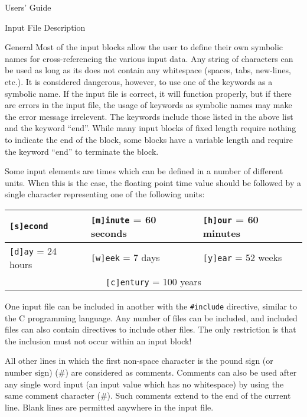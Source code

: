 \begin{chapter}{Users' Guide\label{app:user.guide}}
\begin{section}{Input File Description\label{app:user.input}}
\begin{subsection}{General}
      Most of the input blocks allow the user to define their own
      symbolic names for cross-referencing the various input data.
      Any string of characters can be used as long as its does not
      contain any whitespace (spaces, tabs, new-lines, etc.).  It is
      considered dangerous, however, to use one of the keywords as a
      symbolic name.  If the input file is correct, it will function
      properly, but if there are errors in the input file, the usage
      of keywords as symbolic names may make the error message
      irrelevent.  The keywords include those listed in the above list
      and the keyword ``end''.  While many input blocks of fixed
      length require nothing to indicate the end of the block, some
      blocks have a variable length and require the keyword ``end'' to
      terminate the block.
      
      Some input elements are times which can be defined in a number
      of different units.  When this is the case, the floating point
      time value should be followed by a single character representing
      one of the following units:

      \begin{center}
        \renewcommand{\baselinestretch}{1}\normalsize
        \begin{tabular}{|l|l|l|}
          \hline
          \texttt{[s]econd} & 
          \texttt{[m]inute} = 60 seconds& 
          \texttt{[h]our} = 60 minutes\\\hline
          \texttt{[d]ay} = 24 hours& 
          \texttt{[w]eek} = 7 days& 
          \texttt{[y]ear} = 52 weeks\\\hline
          \multicolumn{3}{|c|}{\texttt{[c]entury} = 100 years}\\\hline
        \end{tabular}
      \end{center}

      One input file can be included in another with the
      \texttt{\#include} directive, similar to the C programming
      language.  Any number of files can be included, and included
      files can also contain directives to include other files.  The
      only restriction is that the inclusion must not occur within an
      input block!
      
      All other lines in which the first non-space character is the
      pound sign (or number sign) (\#) are considered as comments.
      Comments can also be used after any single word input (an input
      value which has no whitespace) by using the same comment
      character (\#).  Such comments extend to the end of the current
      line.  Blank lines are permitted anywhere in the input file.
      

\end{subsection}
\end{section}
\end{chapter}
